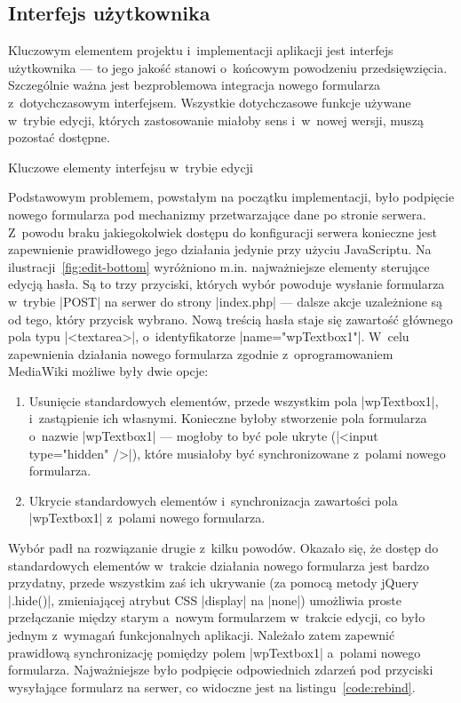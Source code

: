 \subsection{Interfejs użytkownika}
Kluczowym elementem projektu i~implementacji aplikacji jest interfejs użytkownika --- to jego jakość stanowi o~końcowym powodzeniu przedsięwzięcia. Szczególnie ważna jest bezproblemowa integracja nowego formularza z~dotychczasowym interfejsem. Wszystkie dotychczasowe funkcje używane w~trybie edycji, których zastosowanie miałoby sens i~w~nowej wersji, muszą pozostać dostępne.


\begin{illustration}
	\caption{Kluczowe elementy interfejsu w~trybie edycji}
	\label{fig:edit-bottom}
\end{illustration}

Podstawowym problemem, powstałym na początku implementacji, było podpięcie nowego formularza pod mechanizmy przetwarzające dane po stronie serwera. Z~powodu braku jakiegokolwiek dostępu do konfiguracji serwera konieczne jest zapewnienie prawidłowego jego działania jedynie przy użyciu JavaScriptu. Na ilustracji~\ref{fig:edit-bottom} wyróżniono m.in. najważniejsze elementy sterujące edycją hasła. Są to trzy przyciski, których wybór powoduje wysłanie formularza w~trybie \kod|POST| na serwer do strony \kod|index.php| --- dalsze akcje uzależnione są od tego, który przycisk wybrano. Nową treścią hasła staje się zawartość głównego pola typu \kod|<textarea>|, o~identyfikatorze \kod|name="wpTextbox1"|. W~celu zapewnienia działania nowego formularza zgodnie z~oprogramowaniem MediaWiki możliwe były dwie opcje:
\begin{enumerate}
\item Usunięcie standardowych elementów, przede wszystkim pola \kod|wpTextbox1|, i~zastąpienie ich własnymi. Konieczne byłoby stworzenie pola formularza o~nazwie \kod|wpTextbox1| --- mogłoby to być pole ukryte (\kod|<input type="hidden" />|), które musiałoby być synchronizowane z~polami nowego formularza.
\item Ukrycie standardowych elementów i~synchronizacja zawartości pola \kod|wpTextbox1| z~polami nowego formularza.
\end{enumerate}
Wybór padł na rozwiązanie drugie z~kilku powodów. Okazało się, że dostęp do standardowych elementów w~trakcie działania nowego formularza jest bardzo przydatny, przede wszystkim zaś ich ukrywanie (za pomocą metody jQuery \kod|.hide()|, zmieniającej atrybut CSS \kod|display| na \kod|none|) umożliwia proste przełączanie między starym a~nowym formularzem w~trakcie edycji, co było jednym z~wymagań funkcjonalnych aplikacji. Należało zatem zapewnić prawidłową synchronizację pomiędzy polem \kod|wpTextbox1| a~polami nowego formularza. Najważniejsze było podpięcie odpowiednich zdarzeń pod przyciski wysyłające formularz na serwer, co widoczne jest na listingu~\ref{code:rebind}.

